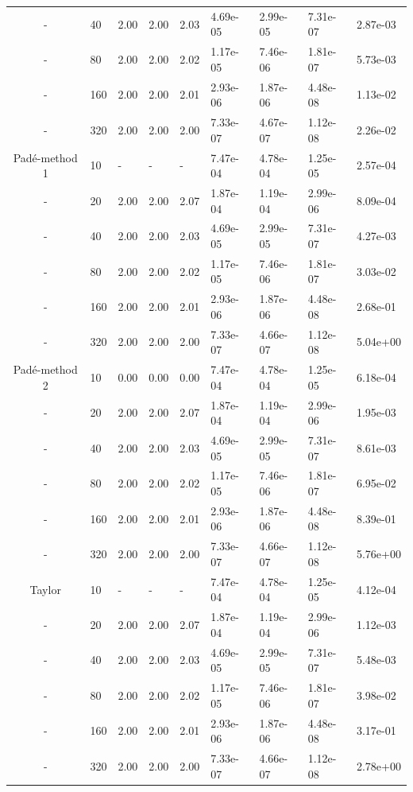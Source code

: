 \begin{table}[h]
{\begin{tabular}{cllllllll}
     - &          40 & 2.00 & 2.00 & 2.03 & 4.69e-05 & 2.99e-05 & 7.31e-07 & 2.87e-03 \\ 
     - &          80 & 2.00 & 2.00 & 2.02 & 1.17e-05 & 7.46e-06 & 1.81e-07 & 5.73e-03 \\ 
     - &         160 & 2.00 & 2.00 & 2.01 & 2.93e-06 & 1.87e-06 & 4.48e-08 & 1.13e-02 \\ 
     - &         320 & 2.00 & 2.00 & 2.00 & 7.33e-07 & 4.67e-07 & 1.12e-08 & 2.26e-02 \\
   \hline
   Pad\'e-method 1 & 10 & - & - & - & 7.47e-04 & 4.78e-04 & 1.25e-05 & 2.57e-04 \\ 
    - &             20 & 2.00 & 2.00 & 2.07 & 1.87e-04 & 1.19e-04 & 2.99e-06 & 8.09e-04 \\ 
    - &             40 & 2.00 & 2.00 & 2.03 & 4.69e-05 & 2.99e-05 & 7.31e-07 & 4.27e-03 \\ 
    - &             80 & 2.00 & 2.00 & 2.02 & 1.17e-05 & 7.46e-06 & 1.81e-07 & 3.03e-02 \\ 
    - &            160 & 2.00 & 2.00 & 2.01 & 2.93e-06 & 1.87e-06 & 4.48e-08 & 2.68e-01 \\ 
    - &            320 & 2.00 & 2.00 & 2.00 & 7.33e-07 & 4.66e-07 & 1.12e-08 & 5.04e+00 \\ 
   \hline
    Pad\'e-method 2 & 10 & 0.00 & 0.00 & 0.00 & 7.47e-04 & 4.78e-04 & 1.25e-05 & 6.18e-04 \\ 
    - &               20 & 2.00 & 2.00 & 2.07 & 1.87e-04 & 1.19e-04 & 2.99e-06 & 1.95e-03 \\ 
    - &               40 & 2.00 & 2.00 & 2.03 & 4.69e-05 & 2.99e-05 & 7.31e-07 & 8.61e-03 \\ 
    - &               80 & 2.00 & 2.00 & 2.02 & 1.17e-05 & 7.46e-06 & 1.81e-07 & 6.95e-02 \\ 
    - &              160 & 2.00 & 2.00 & 2.01 & 2.93e-06 & 1.87e-06 & 4.48e-08 & 8.39e-01 \\ 
    - &              320 & 2.00 & 2.00 & 2.00 & 7.33e-07 & 4.66e-07 & 1.12e-08 & 5.76e+00 \\
   \hline
   Taylor & 10 & - & - & - & 7.47e-04 & 4.78e-04 & 1.25e-05 & 4.12e-04 \\ 
   - &      20 & 2.00 & 2.00 & 2.07 & 1.87e-04 & 1.19e-04 & 2.99e-06 & 1.12e-03 \\ 
   - &      40 & 2.00 & 2.00 & 2.03 & 4.69e-05 & 2.99e-05 & 7.31e-07 & 5.48e-03 \\ 
   - &      80 & 2.00 & 2.00 & 2.02 & 1.17e-05 & 7.46e-06 & 1.81e-07 & 3.98e-02 \\ 
   - &     160 & 2.00 & 2.00 & 2.01 & 2.93e-06 & 1.87e-06 & 4.48e-08 & 3.17e-01 \\ 
   - &     320 & 2.00 & 2.00 & 2.00 & 7.33e-07 & 4.66e-07 & 1.12e-08 & 2.78e+00 \\
   \hline
   \end{tabular}
   }
\end{table}

